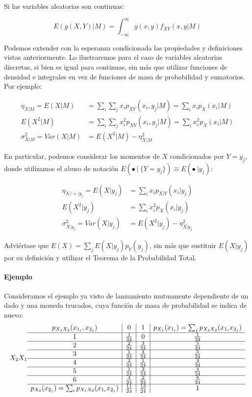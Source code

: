 \documentclass[11pt]{article}
\begin{document}
Si las variables aleatorias son continuas:

\[E(g(X,Y) | M)=\int_{-\infty}^\infty g(x,y)f_{XY}(x,y | M)\]

    Podemos extender con la esperanza condicionada las propiedades y
definiciones vistas anteriormente. Lo ilustraremos para el caso de
variables aleatorias discretas, si bien es igual para continuas, sin más
que utilizar funciones de densidad e integrales en vez de funciones de
masa de probabilidad y sumatorios. Por ejemplo:

\begin{align*}
\eta_{X | M}=E(X | M)&=\sum_i \sum_j x_ip_{XY}(x_i,y_j | M)= \sum_i x_i p_X(x_i | M)\\
E(X^2 | M)&=\sum_i \sum_j x_i^2p_{XY}(x_i,y_j | M)=\sum_i x_i^2 p_X(x_i | M)\\
\sigma_{X | M}^2 = Var(X | M) &= E(X^2 | M)-\eta_{X | M}^2
\end{align*}

    En particular, podemos considerar los momentos de \(X\) condicionados
por \(Y=y_j\), donde utilizamos el abuso de notación
\(E(\bullet \ | \ \{Y=y_j\}) \equiv E(\bullet \ | y_j)\):

\begin{align*}
\eta_{X/+ | y_j}=E(X | y_j)&= \sum_i x_i p_{X | Y}(x_i | y_j)\\
E(X^2 | y_j)&=\sum_i x_i^2 p_X(x_i | y_j)\\
\sigma_{X | y_j}^2 = Var(X | y_j) &= E(X^2 | y_j)-\eta_{X | y_j}^2
\end{align*}

Adviértase que \(E(X) = \sum_j E(X | y_j) p_Y(y_j)\), sin más que
sustituir \(E(X | y_j)\) por su definición y utilizar el Teorema de la
Probabilidad Total.

    \hypertarget{ejemplo}{%
\paragraph{Ejemplo}\label{ejemplo}}

Consideramos el ejemplo ya visto de lanzamiento mutuamente dependiente
de un dado y una moneda trucados, cuya función de masa de probabilidad
se indica de nuevo: \[
X_2 \\X_1 \begin{array}{c|c|c|c}
p_{X_1X_2}(x_{1_i}, x_{2_j}) & 0 & 1 & p_{X_1}(x_{1_i}) = \sum_j p_{X_1X_2}(x_{1_i}x_{2_j})\\
\hline
1 & \frac{1}{24} & 0 & \frac{1}{24}\\
\hline
2 & \frac{2}{24} & \frac{3}{24} & \frac{5}{24}\\
\hline
3 & \frac{1}{24} & \frac{4}{24} & \frac{5}{24}\\
\hline
4 & \frac{2}{24} & \frac{1}{24} & \frac{3}{24}\\
\hline
5 & \frac{1}{24} & \frac{3}{24} & \frac{4}{24}\\
\hline
6 & \frac{4}{24} & \frac{2}{24} & \frac{6}{24}\\
\hline
p_{X_2}(x_{2_j}) = \sum_i p_{X_1X_2}(x_{1_i}x_{2_j}) & \frac{11}{24} & \frac{13}{24} & 1
\end{array}
\]
\end{document}
